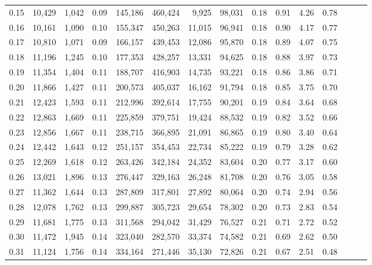\begin{tabular}{rrrrrrrrrrrrrrr}
0.15 &  10,429 &  1,042 &  0.09 &  145,186 &  460,424 &    9,925 &   98,031 &  0.18 &  0.91 &  4.26 &      0.78 \\
0.16 &  10,161 &  1,090 &  0.10 &  155,347 &  450,263 &   11,015 &   96,941 &  0.18 &  0.90 &  4.17 &      0.77 \\
0.17 &  10,810 &  1,071 &  0.09 &  166,157 &  439,453 &   12,086 &   95,870 &  0.18 &  0.89 &  4.07 &      0.75 \\
0.18 &  11,196 &  1,245 &  0.10 &  177,353 &  428,257 &   13,331 &   94,625 &  0.18 &  0.88 &  3.97 &      0.73 \\
0.19 &  11,354 &  1,404 &  0.11 &  188,707 &  416,903 &   14,735 &   93,221 &  0.18 &  0.86 &  3.86 &      0.71 \\
0.20 &  11,866 &  1,427 &  0.11 &  200,573 &  405,037 &   16,162 &   91,794 &  0.18 &  0.85 &  3.75 &      0.70 \\
0.21 &  12,423 &  1,593 &  0.11 &  212,996 &  392,614 &   17,755 &   90,201 &  0.19 &  0.84 &  3.64 &      0.68 \\
0.22 &  12,863 &  1,669 &  0.11 &  225,859 &  379,751 &   19,424 &   88,532 &  0.19 &  0.82 &  3.52 &      0.66 \\
0.23 &  12,856 &  1,667 &  0.11 &  238,715 &  366,895 &   21,091 &   86,865 &  0.19 &  0.80 &  3.40 &      0.64 \\
0.24 &  12,442 &  1,643 &  0.12 &  251,157 &  354,453 &   22,734 &   85,222 &  0.19 &  0.79 &  3.28 &      0.62 \\
0.25 &  12,269 &  1,618 &  0.12 &  263,426 &  342,184 &   24,352 &   83,604 &  0.20 &  0.77 &  3.17 &      0.60 \\
0.26 &  13,021 &  1,896 &  0.13 &  276,447 &  329,163 &   26,248 &   81,708 &  0.20 &  0.76 &  3.05 &      0.58 \\
0.27 &  11,362 &  1,644 &  0.13 &  287,809 &  317,801 &   27,892 &   80,064 &  0.20 &  0.74 &  2.94 &      0.56 \\
0.28 &  12,078 &  1,762 &  0.13 &  299,887 &  305,723 &   29,654 &   78,302 &  0.20 &  0.73 &  2.83 &      0.54 \\
0.29 &  11,681 &  1,775 &  0.13 &  311,568 &  294,042 &   31,429 &   76,527 &  0.21 &  0.71 &  2.72 &      0.52 \\
0.30 &  11,472 &  1,945 &  0.14 &  323,040 &  282,570 &   33,374 &   74,582 &  0.21 &  0.69 &  2.62 &      0.50 \\
0.31 &  11,124 &  1,756 &  0.14 &  334,164 &  271,446 &   35,130 &   72,826 &  0.21 &  0.67 &  2.51 &      0.48 \\

\end{tabular}
